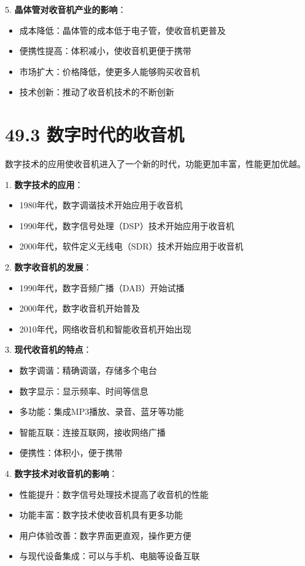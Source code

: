 \documentclass[12pt,UTF8]{ctexbook}
\begin{document}
5. \textbf{晶体管对收音机产业的影响}：
   \begin{itemize}[leftmargin=3.5em]
   \item 成本降低：晶体管的成本低于电子管，使收音机更普及
   \item 便携性提高：体积减小，使收音机更便于携带
   \item 市场扩大：价格降低，使更多人能够购买收音机
   \item 技术创新：推动了收音机技术的不断创新
   \end{itemize}

\section*{49.3 数字时代的收音机}

数字技术的应用使收音机进入了一个新的时代，功能更加丰富，性能更加优越。

1. \textbf{数字技术的应用}：
   \begin{itemize}[leftmargin=3.5em]
   \item 1980年代，数字调谐技术开始应用于收音机
   \item 1990年代，数字信号处理（DSP）技术开始应用于收音机
   \item 2000年代，软件定义无线电（SDR）技术开始应用于收音机
   \end{itemize}

2. \textbf{数字收音机的发展}：
   \begin{itemize}[leftmargin=3.5em]
   \item 1990年代，数字音频广播（DAB）开始试播
   \item 2000年代，数字收音机开始普及
   \item 2010年代，网络收音机和智能收音机开始出现
   \end{itemize}

3. \textbf{现代收音机的特点}：
   \begin{itemize}[leftmargin=3.5em]
   \item 数字调谐：精确调谐，存储多个电台
   \item 数字显示：显示频率、时间等信息
   \item 多功能：集成MP3播放、录音、蓝牙等功能
   \item 智能互联：连接互联网，接收网络广播
   \item 便携性：体积小，便于携带
   \end{itemize}

4. \textbf{数字技术对收音机的影响}：
   \begin{itemize}[leftmargin=3.5em]
   \item 性能提升：数字信号处理技术提高了收音机的性能
   \item 功能丰富：数字技术使收音机具有更多功能
   \item 用户体验改善：数字界面更直观，操作更方便
   \item 与现代设备集成：可以与手机、电脑等设备互联
   \end{itemize}
\end{document}
